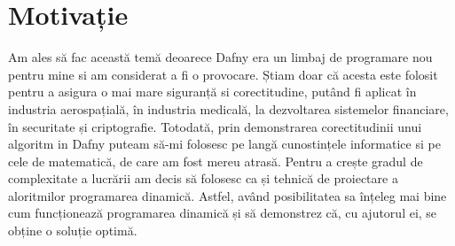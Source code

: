 \chapter*{Motivație} 

Am ales să fac această temă deoarece Dafny era un limbaj de programare nou pentru mine si am considerat a fi o provocare. Știam doar că acesta este folosit pentru a asigura o mai mare siguranță si corectitudine, putând fi aplicat în industria aerospațială, în industria medicală, la dezvoltarea sistemelor financiare, în securitate și  criptografie. Totodată, prin demonstrarea corectitudinii unui algoritm in Dafny puteam să-mi folosesc pe langă cunostințele informatice si pe cele  de matematică, de care am fost mereu atrasă. Pentru a crește gradul de complexitate a lucrării am decis să folosesc ca și tehnică de proiectare a aloritmilor programarea dinamică. Astfel, având posibilitatea sa înțeleg mai bine cum funcționează programarea dinamică și să demonstrez că, cu ajutorul ei, se obține o soluție optimă. 